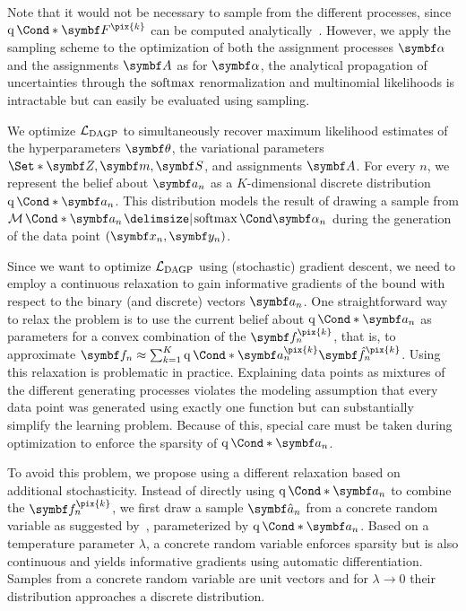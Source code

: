 Note that it would not be necessary to sample from the different processes, since $\Variat*{\mat{F}^{\pix{k}}}$ can be computed analytically~\parencite{hensman_gaussian_2013}.
However, we apply the sampling scheme to the optimization of both the assignment processes $\mat{\alpha}$ and the assignments $\mat{A}$ as for $\mat{\alpha}$, the analytical propagation of uncertainties through the $\operatorname{softmax}$ renormalization and multinomial likelihoods is intractable but can easily be evaluated using sampling.

We optimize $\mathcal{L}_{\text{DAGP}}$ to simultaneously recover maximum likelihood estimates of the hyperparameters $\mat{\theta}$, the variational parameters $\Set*{\mat{Z}, \mat{m}, \mat{S}}$, and assignments $\mat{A}$.
For every $n$, we represent the belief about $\mat{a}_n$ as a $K$-dimensional discrete distribution $\Variat*{\mat{a}_n}$.
This distribution models the result of drawing a sample from $\Multinomial*{\mat{a}_n \given \Fun{\softmax}{\mat{\alpha}_n}}$ during the generation of the data point $(\mat{x}_n, \mat{y}_n)$.

Since we want to optimize $\mathcal{L}_{\text{DAGP}}$ using (stochastic) gradient descent, we need to employ a continuous relaxation to gain informative gradients of the bound with respect to the binary (and discrete) vectors $\mat{a}_n$.
One straightforward way to relax the problem is to use the current belief about $\Variat*{\mat{a}_n}$ as parameters for a convex combination of the $\mat{f}_n^{\pix{k}}$, that is, to approximate $\mat{f}_n \approx \sum_{k=1}^K \Variat*{\mat{a}_n^{\pix{k}}}\mat{\hat{f}}_n^{\pix{k}}$.
Using this relaxation is problematic in practice.
Explaining data points as mixtures of the different generating processes violates the modeling assumption that every data point was generated using exactly one function but can substantially simplify the learning problem.
Because of this, special care must be taken during optimization to enforce the sparsity of $\Variat*{\mat{a}_n}$.

To avoid this problem, we propose using a different relaxation based on additional stochasticity.
Instead of directly using $\Variat*{\mat{a}_n}$ to combine the $\mat{f}_n^{\pix{k}}$, we first draw a sample $\mat{\hat{a}_n}$ from a concrete random variable as suggested by~\textcite{maddison_concrete_2016}, parameterized by $\Variat*{\mat{a}_n}$.
Based on a temperature parameter $\lambda$, a concrete random variable enforces sparsity but is also continuous and yields informative gradients using automatic differentiation.
Samples from a concrete random variable are unit vectors and for $\lambda \to 0$ their distribution approaches a discrete distribution.

